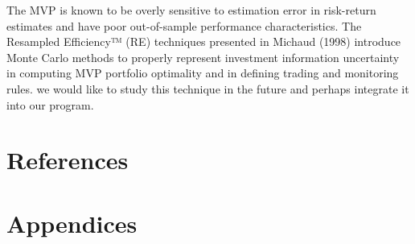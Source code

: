 \documentclass[12pt,titlepage,a4paper]{article}
\begin{document}
The MVP is known to be overly sensitive to estimation error in risk-return estimates and have poor out-of-sample performance characteristics. The Resampled Efficiency™ (RE) techniques presented in Michaud (1998) introduce Monte Carlo methods to properly represent investment information uncertainty in computing MVP portfolio optimality and in defining trading and monitoring rules.  we would like to study this technique in the future and perhaps integrate it into our program.\\

\section{References}

\section{Appendices}
\end{document}
